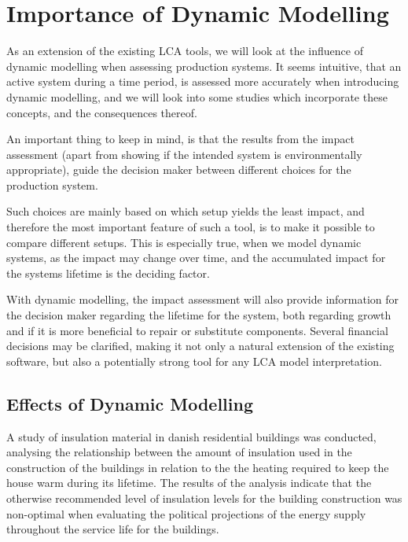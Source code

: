 \section{Importance of Dynamic Modelling}\label{sec:Importance}

As an extension of the existing LCA tools, we will look at the influence of dynamic modelling when assessing production systems. It seems intuitive, that an active system during a time period, is assessed more accurately when introducing dynamic modelling, and we will look into some studies which incorporate these concepts, and the consequences thereof. 

An important thing to keep in mind, is that the results from the impact assessment (apart from showing if the intended system is environmentally appropriate), guide the decision maker between different choices for the production system. 

Such choices are mainly based on which setup yields the least impact, and therefore the most important feature of such a tool, is to make it possible to compare different setups. This is especially true, when we model dynamic systems, as the impact may change over time, and the accumulated impact for the systems lifetime is the deciding factor. 

With dynamic modelling, the impact assessment will also provide information for the decision maker regarding the lifetime for the system, both regarding growth and if it is more beneficial to repair or substitute components. Several financial decisions may be clarified, making it not only a natural extension of the existing software, but also a potentially strong tool for any LCA model interpretation. 

\subsection{Effects of Dynamic Modelling} \label{sec:EffectsDLCA}

A study of insulation material in danish residential buildings was conducted, analysing the relationship between the amount of insulation used in the construction of the buildings in relation to the the heating required to keep the house warm during its lifetime. The results of the analysis indicate that the otherwise recommended level of insulation levels for the building construction was non-optimal when evaluating the political projections of the energy supply throughout the service life for the buildings. 

